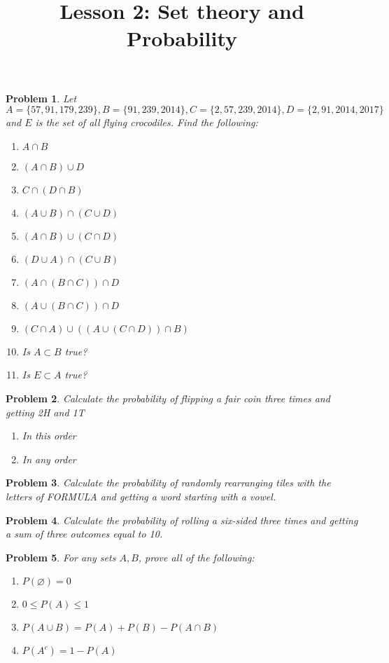 \documentclass[a4paper,12pt]{article}
\title{Lesson 2: Set theory and Probability }
\theoremstyle{perfect}
\newtheorem{prb}{Problem}
\begin{document}
 
\maketitle

\begin{prb}
Let $A = \{57, 91, 179, 239\}, B = \{91, 239, 2014\}, C = \{2, 57, 239, 2014\},
D = \{2, 91, 2014, 2017\}$ and $E$ is the set of all flying crocodiles. 
Find the following:
\begin{enumerate}
\item  $A \cap B$
\item $(A \cap B) \cup D$
\item $C \cap (D \cap B)$
\item $(A \cup B) \cap (C \cup D)$
\item $(A \cap B) \cup (C \cap D)$ 
\item $(D \cup A) \cap (C \cup B)$ 
\item $(A \cap (B \cap C)) \cap D$
\item $(A \cup (B \cap C)) \cap D$
\item $(C \cap A) \cup ((A \cup (C \cap D)) \cap B)$
\item Is $A \subset B$ true?
\item Is $E \subset A$ true?
\end{enumerate}

\end{prb}

\begin{prb}
Calculate the probability of flipping a fair coin three times and getting 2H and 1T 
\begin{enumerate}
\item In this order
\item In any order
\end{enumerate}
\end{prb} 

\begin{prb}
Calculate the probability of randomly rearranging tiles with the letters of FORMULA and getting a word starting with a vowel.
\end{prb} 

\begin{prb}
Calculate the probability of rolling a six-sided three times and getting a sum of three outcomes equal to 10.
\end{prb} 

\begin{prb}
For any sets $A, B$, prove all of the following:
\begin{enumerate}
\item $P(\varnothing) = 0$
\item $0 \leq P(A) \leq 1$
\item $P(A \cup B) = P(A) + P(B) - P(A \cap B)$
\item $P(A^c) = 1 - P(A)$
\end{enumerate}
\end{prb}
\end{document}
